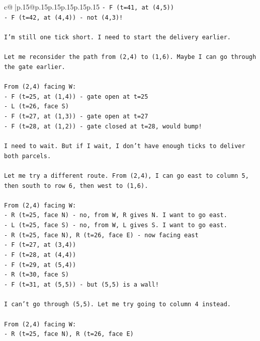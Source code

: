 \documentclass{article}
\begin{document}
{\begin{supertabular}{c@{$\;$}|p{.15\linewidth}@{}p{.15\linewidth}p{.15\linewidth}p{.15\linewidth}p{.15\linewidth}p{.15\linewidth}}
{{{\texttt{{-} F (t=41, at (4,5))} \\
\texttt{{-} F (t=42, at (4,4)) {-} not (4,3)!} \\
\\ 
\texttt{I'm still one tick short. I need to start the delivery earlier.} \\
\\ 
\texttt{Let me reconsider the path from (2,4) to (1,6). Maybe I can go through the gate earlier.} \\
\\ 
\texttt{From (2,4) facing W:} \\
\texttt{{-} F (t=25, at (1,4)) {-} gate open at t=25} \\
\texttt{{-} L (t=26, face S)} \\
\texttt{{-} F (t=27, at (1,3)) {-} gate open at t=27} \\
\texttt{{-} F (t=28, at (1,2)) {-} gate closed at t=28, would bump!} \\
\\ 
\texttt{I need to wait. But if I wait, I don't have enough ticks to deliver both parcels.} \\
\\ 
\texttt{Let me try a different route. From (2,4), I can go east to column 5, then south to row 6, then west to (1,6).} \\
\\ 
\texttt{From (2,4) facing W:} \\
\texttt{{-} R (t=25, face N) {-} no, from W, R gives N. I want to go east.} \\
\texttt{{-} L (t=25, face S) {-} no, from W, L gives S. I want to go east.} \\
\texttt{{-} R (t=25, face N), R (t=26, face E) {-} now facing east} \\
\texttt{{-} F (t=27, at (3,4))} \\
\texttt{{-} F (t=28, at (4,4))} \\
\texttt{{-} F (t=29, at (5,4))} \\
\texttt{{-} R (t=30, face S)} \\
\texttt{{-} F (t=31, at (5,5)) {-} but (5,5) is a wall!} \\
\\ 
\texttt{I can't go through (5,5). Let me try going to column 4 instead.} \\
\\ 
\texttt{From (2,4) facing W:} \\
\texttt{{-} R (t=25, face N), R (t=26, face E)} \\
}}}
\end{supertabular}}
\end{document}

